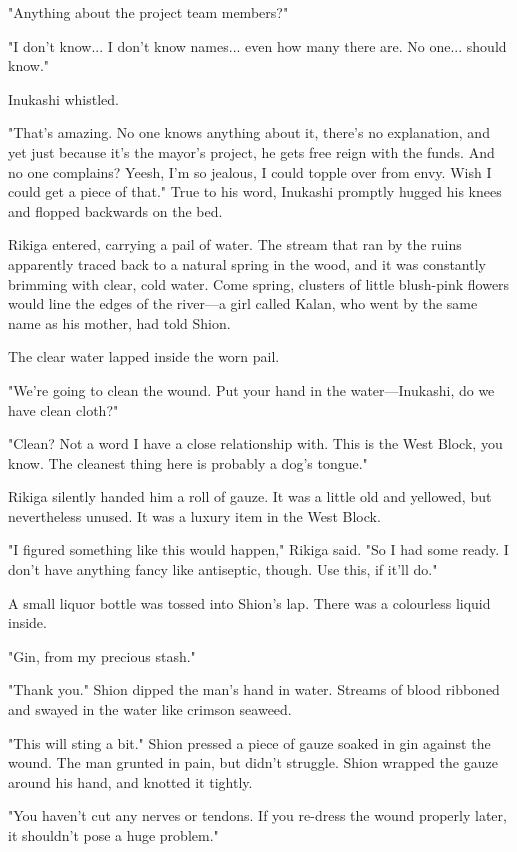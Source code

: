 "Anything about the project team members?"

"I don't know... I don't know names... even how many there are. No
one... should know."

Inukashi whistled.

"That's amazing. No one knows anything about it, there's no explanation,
and yet just because it's the mayor's project, he gets free reign with
the funds. And no one complains? Yeesh, I'm so jealous, I could topple
over from envy. Wish I could get a piece of that." True to his word,
Inukashi promptly hugged his knees and flopped backwards on the bed.

Rikiga entered, carrying a pail of water. The stream that ran by the
ruins apparently traced back to a natural spring in the wood, and it was
constantly brimming with clear, cold water. Come spring, clusters of
little blush-pink flowers would line the edges of the river---a girl
called Kalan, who went by the same name as his mother, had told Shion.

The clear water lapped inside the worn pail.

"We're going to clean the wound. Put your hand in the water---Inukashi, do
we have clean cloth?"

"Clean? Not a word I have a close relationship with. This is the West
Block, you know. The cleanest thing here is probably a dog's tongue."

Rikiga silently handed him a roll of gauze. It was a little old and
yellowed, but nevertheless unused. It was a luxury item in the West
Block.

"I figured something like this would happen," Rikiga said. "So I had
some ready. I don't have anything fancy like antiseptic, though. Use
this, if it'll do."

A small liquor bottle was tossed into Shion's lap. There was a
colourless liquid inside.

"Gin, from my precious stash."

"Thank you." Shion dipped the man's hand in water. Streams of blood
ribboned and swayed in the water like crimson seaweed.

"This will sting a bit." Shion pressed a piece of gauze soaked in gin
against the wound. The man grunted in pain, but didn't struggle. Shion
wrapped the gauze around his hand, and knotted it tightly.

"You haven't cut any nerves or tendons. If you re-dress the wound
properly later, it shouldn't pose a huge problem."

